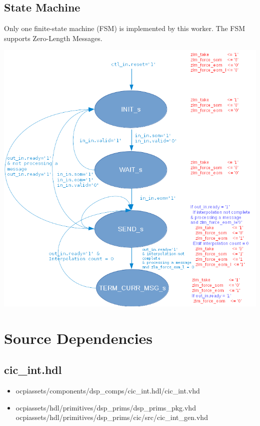 \documentclass{article}
\def\comp{cic\_int}
\begin{document}
\subsection*{State Machine}
\begin{flushleft}
	Only one finite-state machine (FSM) is implemented by this worker. The FSM supports Zero-Length Messages.
\end{flushleft}
{\centering\captionsetup{type=figure}\includegraphics[scale=0.45]{cic_interpolator_zlm_fsm}
	\label{fig:zlm_fsm}}

\newpage

\section*{Source Dependencies}
\subsection*{\comp.hdl}
\begin{itemize}
	\item ocpiassets/components/dsp\_comps/cic\_int.hdl/cic\_int.vhd
	\item ocpiassets/hdl/primitives/dsp\_prims/dsp\_prims\_pkg.vhd
	      \subitem ocpiassets/hdl/primitives/dsp\_prims/cic/src/cic\_int\_gen.vhd
\end{itemize}
\end{document}

